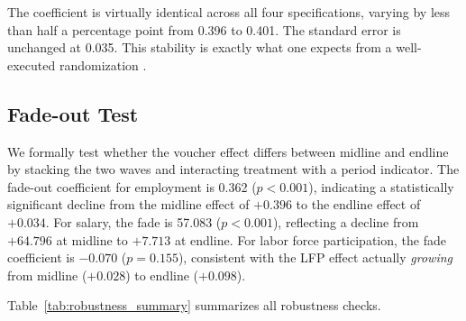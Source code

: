\documentclass[12pt]{article}
\begin{document}
The coefficient is virtually identical across all four specifications, varying by less than half a percentage point from 0.396 to 0.401. The standard error is unchanged at 0.035. This stability is exactly what one expects from a well-executed randomization \citep{bruhn2009pursuit, lin2013agnostic}.

\subsection{Fade-out Test}

We formally test whether the voucher effect differs between midline and endline by stacking the two waves and interacting treatment with a period indicator. The fade-out coefficient for employment is 0.362 ($p < 0.001$), indicating a statistically significant decline from the midline effect of $+0.396$ to the endline effect of $+0.034$. For salary, the fade is 57.083 ($p < 0.001$), reflecting a decline from $+64.796$ at midline to $+7.713$ at endline. For labor force participation, the fade coefficient is $-0.070$ ($p = 0.155$), consistent with the LFP effect actually \textit{growing} from midline ($+0.028$) to endline ($+0.098$).

Table~\ref{tab:robustness_summary} summarizes all robustness checks.
\end{document}
